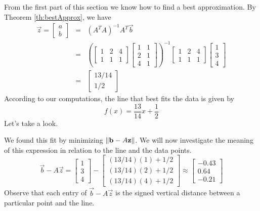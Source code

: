 \documentclass{ximera}
\begin{document}
\begin{exploration}
    From the first part of this section we know how to find a best approximation.  By Theorem \ref{th:bestApprox}, we have
    \begin{eqnarray*}
\vec{z}=\begin{bmatrix}a\\b\end{bmatrix}&=&\left(A^TA\right)^{-1}A^T\vec{b}\\
&=&\left(\begin{bmatrix}1&2&4\\1&1&1\end{bmatrix}\begin{bmatrix}
1&1\\2&1\\4&1\end{bmatrix}\right)^{-1}\begin{bmatrix}1&2&4\\1&1&1\end{bmatrix}\begin{bmatrix}
    1\\3\\4
\end{bmatrix}\\
&=&\begin{bmatrix}13/14\\1/2\end{bmatrix}
\end{eqnarray*}
According to our computations, the line that best fits the data is given by $$f(x)=\frac{13}{14}x+\frac{1}{2}$$
Let's take a look.
\begin{center}
 \end{center}

We found this fit by minimizing $\left\lVert\mathbf{b}-A\mathbf{z}\right\rVert$.  We will now investigate the meaning of this expression in relation to the line and the data points.
\begin{equation}
    \vec{b}-A\vec{z}=\begin{bmatrix}1\\3\\4\end{bmatrix}-\begin{bmatrix}(13/14)(1)+1/2\\(13/14)(2)+1/2\\{(13/14)(4)+1/2}\end{bmatrix}\approx\begin{bmatrix}
        -0.43\\0.64\\-0.21
    \end{bmatrix}
\end{equation}
Observe that each entry of $\vec{b}-A\vec{z}$ is the signed vertical distance between a particular point and the line.


\end{exploration}
\end{document}
